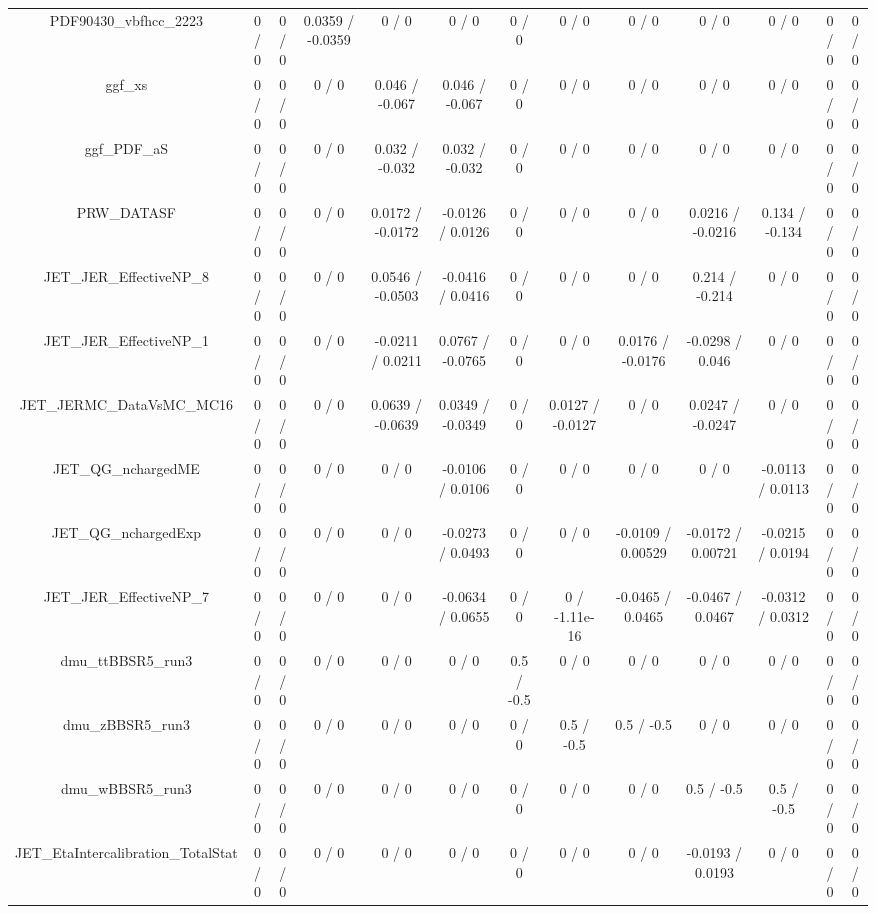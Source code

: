 \documentclass[10pt]{article}
\begin{document}
\begin{table}[htbp]
\begin{center}
\begin{tabular}{|c|c|c|c|c|c|c|c|c|c|c|c|c|}
  PDF90430_vbfhcc_2223 & 0 / 0 & 0 / 0 & 0.0359 / -0.0359 & 0 / 0 & 0 / 0 & 0 / 0 & 0 / 0 & 0 / 0 & 0 / 0 & 0 / 0 & 0 / 0 & 0 / 0 \\ 
  ggf_xs & 0 / 0 & 0 / 0 & 0 / 0 & 0.046 / -0.067 & 0.046 / -0.067 & 0 / 0 & 0 / 0 & 0 / 0 & 0 / 0 & 0 / 0 & 0 / 0 & 0 / 0 \\ 
  ggf_PDF_aS & 0 / 0 & 0 / 0 & 0 / 0 & 0.032 / -0.032 & 0.032 / -0.032 & 0 / 0 & 0 / 0 & 0 / 0 & 0 / 0 & 0 / 0 & 0 / 0 & 0 / 0 \\ 
  PRW_DATASF & 0 / 0 & 0 / 0 & 0 / 0 & 0.0172 / -0.0172 & -0.0126 / 0.0126 & 0 / 0 & 0 / 0 & 0 / 0 & 0.0216 / -0.0216 & 0.134 / -0.134 & 0 / 0 & 0 / 0 \\ 
  JET_JER_EffectiveNP_8 & 0 / 0 & 0 / 0 & 0 / 0 & 0.0546 / -0.0503 & -0.0416 / 0.0416 & 0 / 0 & 0 / 0 & 0 / 0 & 0.214 / -0.214 & 0 / 0 & 0 / 0 & 0 / 0 \\ 
  JET_JER_EffectiveNP_1 & 0 / 0 & 0 / 0 & 0 / 0 & -0.0211 / 0.0211 & 0.0767 / -0.0765 & 0 / 0 & 0 / 0 & 0.0176 / -0.0176 & -0.0298 / 0.046 & 0 / 0 & 0 / 0 & 0 / 0 \\ 
  JET_JERMC_DataVsMC_MC16 & 0 / 0 & 0 / 0 & 0 / 0 & 0.0639 / -0.0639 & 0.0349 / -0.0349 & 0 / 0 & 0.0127 / -0.0127 & 0 / 0 & 0.0247 / -0.0247 & 0 / 0 & 0 / 0 & 0 / 0 \\ 
  JET_QG_nchargedME & 0 / 0 & 0 / 0 & 0 / 0 & 0 / 0 & -0.0106 / 0.0106 & 0 / 0 & 0 / 0 & 0 / 0 & 0 / 0 & -0.0113 / 0.0113 & 0 / 0 & 0 / 0 \\ 
  JET_QG_nchargedExp & 0 / 0 & 0 / 0 & 0 / 0 & 0 / 0 & -0.0273 / 0.0493 & 0 / 0 & 0 / 0 & -0.0109 / 0.00529 & -0.0172 / 0.00721 & -0.0215 / 0.0194 & 0 / 0 & 0 / 0 \\ 
  JET_JER_EffectiveNP_7 & 0 / 0 & 0 / 0 & 0 / 0 & 0 / 0 & -0.0634 / 0.0655 & 0 / 0 & 0 / -1.11e-16 & -0.0465 / 0.0465 & -0.0467 / 0.0467 & -0.0312 / 0.0312 & 0 / 0 & 0 / 0 \\ 
  dmu_ttBBSR5_run3 & 0 / 0 & 0 / 0 & 0 / 0 & 0 / 0 & 0 / 0 & 0.5 / -0.5 & 0 / 0 & 0 / 0 & 0 / 0 & 0 / 0 & 0 / 0 & 0 / 0 \\ 
  dmu_zBBSR5_run3 & 0 / 0 & 0 / 0 & 0 / 0 & 0 / 0 & 0 / 0 & 0 / 0 & 0.5 / -0.5 & 0.5 / -0.5 & 0 / 0 & 0 / 0 & 0 / 0 & 0 / 0 \\ 
  dmu_wBBSR5_run3 & 0 / 0 & 0 / 0 & 0 / 0 & 0 / 0 & 0 / 0 & 0 / 0 & 0 / 0 & 0 / 0 & 0.5 / -0.5 & 0.5 / -0.5 & 0 / 0 & 0 / 0 \\ 
  JET_EtaIntercalibration_TotalStat & 0 / 0 & 0 / 0 & 0 / 0 & 0 / 0 & 0 / 0 & 0 / 0 & 0 / 0 & 0 / 0 & -0.0193 / 0.0193 & 0 / 0 & 0 / 0 & 0 / 0 \\ 

\end{tabular}
\end{center}
\end{table}
\end{document}

